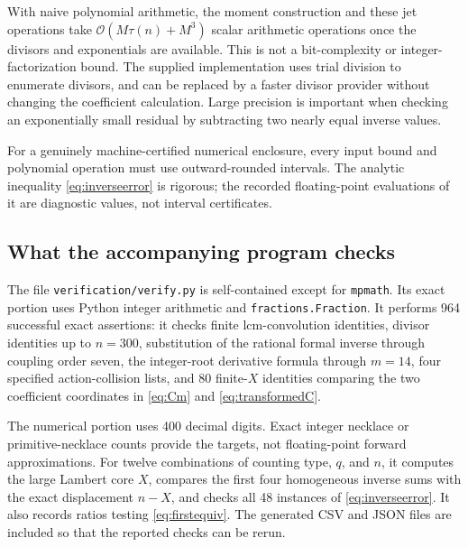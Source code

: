 \documentclass[11pt,a4paper]{article}
\numberwithin{equation}{section}
\theoremstyle{definition}
\theoremstyle{remark}
\newcommand{\bigO}{\mathcal O}
\begin{document}
With naive polynomial arithmetic, the moment construction and these
jet operations take $\bigO(M\tau(n)+M^3)$ scalar arithmetic
operations once the divisors and exponentials are available. This is
not a bit-complexity or integer-factorization bound. The supplied
implementation uses trial division to enumerate divisors, and can be
replaced by a faster divisor provider without changing the coefficient
calculation. Large precision is important when checking an exponentially
small residual by subtracting two nearly equal inverse values.

For a genuinely machine-certified numerical enclosure, every input
bound and polynomial operation must use outward-rounded intervals.
The analytic inequality \eqref{eq:inverseerror} is rigorous; the
recorded floating-point evaluations of it are diagnostic values, not
interval certificates.

\subsection{What the accompanying program checks}

The file \texttt{verification/verify.py} is self-contained except for
\texttt{mpmath}. Its exact portion uses Python integer arithmetic and
\texttt{fractions.Fraction}. It performs 964 successful exact assertions:
it checks finite lcm-convolution identities, divisor identities up to
$n=300$, substitution of the rational formal inverse through coupling
order seven, the integer-root derivative formula through $m=14$, four
specified action-collision lists, and 80 finite-$X$ identities comparing
the two coefficient coordinates in \eqref{eq:Cm} and
\eqref{eq:transformedC}.

The numerical portion uses 400 decimal digits. Exact integer necklace
or primitive-necklace counts provide the targets, not floating-point
forward approximations. For twelve combinations of counting type,
$q$, and $n$, it computes the large Lambert core $X$, compares the first
four homogeneous inverse sums with the exact displacement $n-X$, and
checks all 48 instances of \eqref{eq:inverseerror}. It also records
ratios testing \eqref{eq:firstequiv}. The generated CSV and JSON files
are included so that the reported checks can be rerun.
\end{document}
